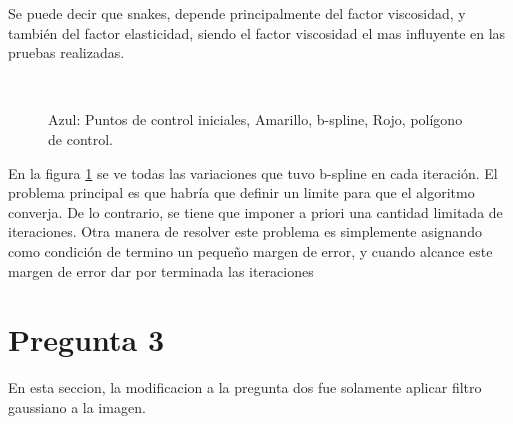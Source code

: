 \documentclass[a4paper,10pt]{article}
\begin{document}
Se puede decir que snakes, depende principalmente del factor viscosidad, y
también del factor elasticidad, siendo el factor viscosidad el mas influyente
en las pruebas realizadas.
\begin{figure}[ht!]
  \centering
  ~ 
  ~ 
  \caption{Azul: Puntos de control iniciales, Amarillo, b-spline, Rojo, polígono de control. }
  \label{fig:p2b}
\end{figure}
En la figura \ref{fig:p2b} se ve todas las variaciones que tuvo b-spline en
cada iteración.  El problema principal es que habría que definir un limite para
que el algoritmo converja. De lo contrario, se tiene que imponer a priori una
cantidad limitada de iteraciones.  Otra manera de resolver este problema es
simplemente asignando como condición de termino un pequeño margen de error, y
cuando alcance este margen de error dar por terminada las iteraciones

\newpage
\section{Pregunta 3}
En esta seccion, la modificacion a la pregunta dos fue solamente aplicar filtro gaussiano a la imagen.
\end{document}

